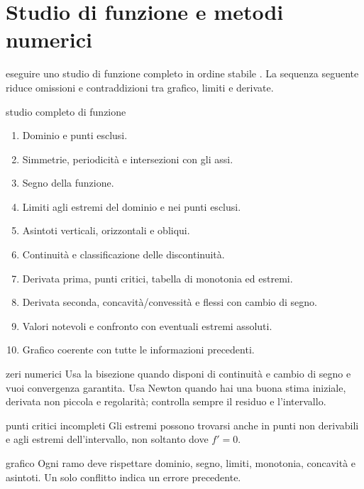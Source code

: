 \chapter{Studio di funzione e metodi numerici}
\label{chap:13}

\begin{obiettivocapitolo}{eseguire uno studio di funzione completo in ordine stabile}
\prioritaalta. La sequenza seguente riduce omissioni e contraddizioni tra grafico, limiti e derivate.
\end{obiettivocapitolo}
\begin{proceduraesame}{studio completo di funzione}
\begin{enumerate}
\item Dominio e punti esclusi.
\item Simmetrie, periodicità e intersezioni con gli assi.
\item Segno della funzione.
\item Limiti agli estremi del dominio e nei punti esclusi.
\item Asintoti verticali, orizzontali e obliqui.
\item Continuità e classificazione delle discontinuità.
\item Derivata prima, punti critici, tabella di monotonia ed estremi.
\item Derivata seconda, concavità/convessità e flessi con cambio di segno.
\item Valori notevoli e confronto con eventuali estremi assoluti.
\item Grafico coerente con tutte le informazioni precedenti.
\end{enumerate}
\end{proceduraesame}
\begin{sceltametodo}{zeri numerici}
Usa la bisezione quando disponi di continuità e cambio di segno e vuoi convergenza garantita. Usa Newton quando hai una buona stima iniziale, derivata non piccola e regolarità; controlla sempre il residuo e l'intervallo.
\end{sceltametodo}
\begin{errorefrequente}{punti critici incompleti}
Gli estremi possono trovarsi anche in punti non derivabili e agli estremi dell'intervallo, non soltanto dove $f'=0$.
\end{errorefrequente}
\begin{controllofinale}{grafico}
Ogni ramo deve rispettare dominio, segno, limiti, monotonia, concavità e asintoti. Un solo conflitto indica un errore precedente.
\end{controllofinale}

